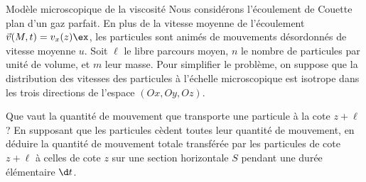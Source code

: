 \begin{exo}[PC][3][TD]{Modèle microscopique de la viscosité}
  Nous considérons l'écoulement de Couette plan d'un gaz parfait. En plus de la vitesse moyenne de l'écoulement $\Vec{v}(M,t) = v_x(z) \ex$, les particules sont animés de mouvements désordonnés de vitesse moyenne $u$. Soit $\ell$ le libre parcours moyen, $n$ le nombre de particules par unité de volume, et $m$ leur masse. Pour simplifier le problème, on suppose que la distribution des vitesses des particules à l'échelle microscopique est isotrope dans les trois directions de l'espace $(Ox,Oy,Oz)$.

  \begin{quest}
    \item Que vaut la quantité de mouvement que transporte une particule à la cote $z+\ell$ ? En supposant que les particules cèdent toutes leur quantité de mouvement, en déduire la quantité de mouvement totale transférée par les particules de cote $z+\ell$ à celles de cote $z$ sur une section horizontale $S$ pendant une durée élémentaire $\d t$.
\end{quest}
\end{exo}
